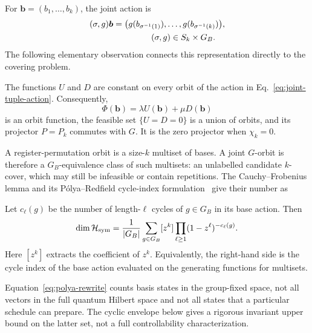 For $\boldsymbol b=(b_1,\ldots,b_k)$, the joint action is
\begin{equation}
 \begin{aligned}
 (\sigma,g)\boldsymbol b
 &=\bigl(g(b_{\sigma^{-1}(1)}),\ldots,
 g(b_{\sigma^{-1}(k)})\bigr),\\
 &\hspace{4.5em}(\sigma,g)\in S_k\times G_B.
 \end{aligned}
 \label{eq:joint-tuple-action}
\end{equation}
The following elementary observation connects this representation directly
to the covering problem.

\begin{lemma}
\label{lem:orbit-invariance}
The functions $U$ and $D$ are constant on every orbit of the action in
Eq.~\eqref{eq:joint-tuple-action}.  Consequently,
\begin{equation}
 \Phi(\boldsymbol b)=\lambda U(\boldsymbol b)+\mu D(\boldsymbol b)
 \label{eq:orbit-potential}
\end{equation}
is an orbit function, the feasible set $\{U=D=0\}$ is a union of orbits,
and its projector $P=P_k$ commutes with $G$.  It is the zero projector when
$\chi_k=0$.
\end{lemma}

A register-permutation orbit is a size-$k$ multiset of bases.  A joint
$G$-orbit is therefore a $G_B$-equivalence class of such multisets: an
unlabelled candidate $k$-cover, which may still be infeasible or contain
repetitions.  The Cauchy--Frobenius lemma and its P\'olya--Redfield
cycle-index formulation~\cite{Burnside1911,Redfield1927,Polya1937} give
their number as
\begin{proposition}
\label{prop:orbit-count}
Let $c_\ell(g)$ be the number of length-$\ell$ cycles of $g\in G_B$ in its
base action.  Then
\begin{equation}
 \dim\mathcal H_{\rm sym}
 =\frac1{|G_B|}\sum_{g\in G_B}[z^k]
 \prod_{\ell\geq1}(1-z^\ell)^{-c_\ell(g)}.
 \label{eq:polya-rewrite}
\end{equation}
Here $[z^k]$ extracts the coefficient of $z^k$.  Equivalently, the
right-hand side is the cycle index of the base action evaluated on the
generating functions for multisets.
\end{proposition}

Equation~\eqref{eq:polya-rewrite} counts basis states in the group-fixed
space, not all vectors in the full quantum Hilbert space and not all states
that a particular schedule can prepare.  The cyclic envelope below gives a
rigorous invariant upper bound on the latter set, not a full controllability
characterization.


